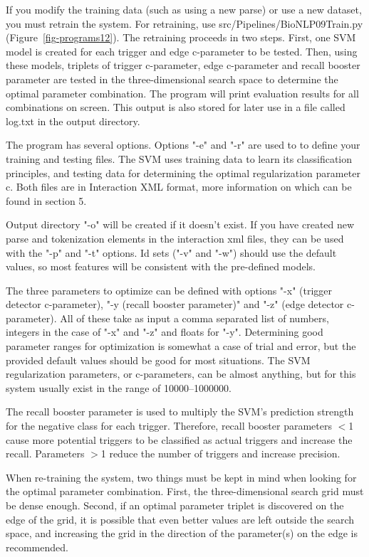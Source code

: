 \documentclass[a4paper,12pt]{article}
\begin{document}
If you modify the training data (such as using a new parse) or use a new dataset,
you must retrain the system. For retraining, use src/Pipelines/BioNLP09Train.py
(Figure~\ref{fig-programs12}). The retraining proceeds in two steps. First, one
SVM model is created for each trigger and edge c-parameter to be tested. Then, using these models, triplets of
trigger c-parameter, edge c-parameter and recall booster parameter are tested in
the three-dimensional search space to determine the optimal parameter
combination. The program will print evaluation results for all combinations on
screen. This output is also stored for later use in a file called log.txt in the
output directory.

The program has several options. Options "-e" and "-r" are used to to define your
training and testing files. The SVM uses training data to learn its
classification principles, and testing data for determining the optimal
regularization parameter c. Both files are in Interaction XML format, more
information on which can be found in section 5.

Output directory "-o" will be created if it doesn't exist. If you have created
new parse and tokenization elements in the interaction xml files, they can be
used with the "-p" and "-t" options. Id sets ("-v" and "-w") should use the
default values, so most features will be consistent with the pre-defined models.

The three parameters to optimize can be defined with options "-x" (trigger
detector c-parameter), "-y (recall booster parameter)" and "-z" (edge detector
c-parameter). All of these take as input a comma separated list of numbers,
integers in the case of "-x" and "-z" and floats for "-y". Determining good
parameter ranges for optimization is somewhat a case of trial and error, but the
provided default values should be good for most situations. The SVM
regularization parameters, or c-parameters, can be almost anything, but for this
system usually exist in the range of 10000--1000000.

The recall booster parameter is used to multiply the SVM's prediction strength
for the negative class for each trigger. Therefore, recall booster parameters
$<$1 cause more potential triggers to be classified as actual triggers and increase
the recall. Parameters $>$1 reduce the number of triggers and increase
precision.

When re-training the system, two things must be kept in mind when looking for the
optimal parameter combination. First, the three-dimensional search grid must be
dense enough. Second, if an optimal parameter triplet is discovered on the edge
of the grid, it is possible that even better values are left outside the search
space, and increasing the grid in the direction of the parameter(s) on the edge
is recommended.
\end{document}
